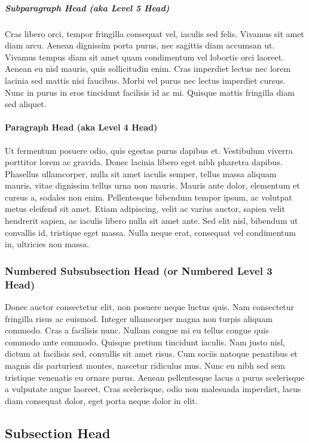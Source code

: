 \subparagraph{ Subparagraph Head (aka Level 5 Head)}
Cras libero orci, tempor fringilla consequat vel, iaculis sed felis. Vivamus sit amet diam arcu. Aenean dignissim porta purus, nec sagittis diam accumsan ut. Vivamus tempus diam sit amet quam condimentum vel lobortis orci laoreet. Aenean eu nisl mauris, quis sollicitudin enim. Cras imperdiet lectus nec lorem lacinia sed mattis nisi faucibus. Morbi vel purus nec lectus imperdiet cursus. Nunc in purus in eros tincidunt facilisis id ac mi. Quisque mattis fringilla diam sed aliquet. 

\paragraph{Paragraph Head (aka Level 4 Head)}
Ut fermentum posuere odio, quis egestas purus dapibus et. Vestibulum viverra porttitor lorem ac gravida. Donec lacinia libero eget nibh pharetra dapibus. Phasellus ullamcorper, nulla sit amet iaculis semper, tellus massa aliquam mauris, vitae dignissim tellus urna non mauris. Mauris ante dolor, elementum et cursus a, sodales non enim. Pellentesque bibendum tempor ipsum, ac volutpat metus eleifend sit amet. Etiam adipiscing, velit ac varius auctor, sapien velit hendrerit sapien, ac iaculis libero nulla sit amet ante. Sed elit nisl, bibendum ut convallis id, tristique eget massa. Nulla neque erat, consequat vel condimentum in, ultricies non massa. 

\subsubsection{Numbered Subsubsection Head (or Numbered Level 3 Head)}
Donec auctor consectetur elit, non posuere neque luctus quis. Nam consectetur fringilla risus ac euismod. Integer ullamcorper magna non turpis aliquam commodo. Cras a facilisis nunc. Nullam congue mi eu tellus congue quis commodo ante commodo. Quisque pretium tincidunt iaculis. Nam justo nisl, dictum at facilisis sed, convallis sit amet risus. Cum sociis natoque penatibus et magnis dis parturient montes, nascetur ridiculus mus. Nunc eu nibh sed sem tristique venenatis eu ornare purus. Aenean pellentesque lacus a purus scelerisque a vulputate augue laoreet. Cras scelerisque, odio non malesuada imperdiet, lacus diam consequat dolor, eget porta neque dolor in elit.

\subsection{Subsection Head}

